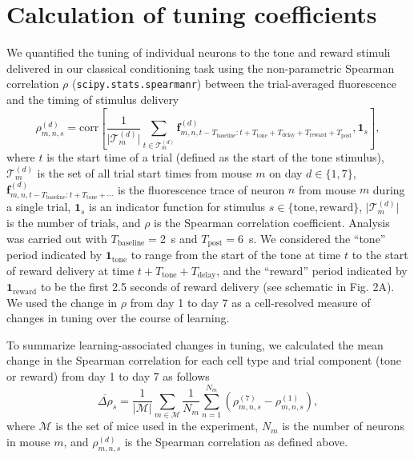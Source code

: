 \documentclass{article}
\begin{document}
\section{Calculation of tuning coefficients}

We quantified the tuning of individual neurons to the tone and reward stimuli
delivered in our classical conditioning task using the non-parametric Spearman
correlation $\rho$ (\texttt{scipy.stats.spearmanr}) between the trial-averaged
fluorescence and the timing of stimulus delivery
\begin{equation}
    \rho_{m,n,s}^{(d)} =
    \text{corr} \left[%
        \frac{1}{\lvert \mathcal{T}_{m}^{(d)} \rvert}
        \sum_{t \in
        \mathcal{T}_{m}^{(d)}}
        \mathbf{f}_{m,n,t - T_\text{baseline}:t+T_\text{tone}
        + T_\text{delay} + T_\text{reward} + T_\text{post}}^{(d)},
        \mathbf{1}_s
    \right],
\end{equation}
where $t$ is the start time of a trial (defined as the start of the tone
stimulus), $\mathcal{T}_{m}^{(d)}$ is the set of all trial start times from
mouse $m$ on day $d \in \{1, 7\}$,
$\mathbf{f}_{m,n,t-T_\text{baseline}:t+T_\text{tone} + \cdots}^{(d)}$ is the
fluorescence trace of neuron $n$ from mouse $m$ during a single trial, $\mathbf{1}_s$ is an indicator function for stimulus $s \in \{\text{tone},
\text{reward}\}$, $\lvert \mathcal{T}_{m}^{(d)} \rvert$ is the number of trials,
and $\rho$ is the Spearman correlation coefficient.  Analysis was carried out
with $T_\text{baseline} =$\SI{2}{\s} and $T_\text{post} =$\SI{6}{\s}.  We
considered the ``tone'' period indicated by $\mathbf{1}_\text{tone}$ to range
from the start of the tone at time $t$ to the start of reward delivery at time
$t + T_\text{tone} + T_\text{delay}$, and the ``reward'' period indicated by
$\mathbf{1}_\text{reward}$ to be the first 2.5 seconds of reward delivery (see
schematic in Fig. 2A). We used the change in $\rho$ from day 1 to day 7 as a
cell-resolved measure of changes in tuning over the course of learning.

To summarize learning-associated changes in tuning, we calculated the mean
change in the Spearman correlation for each cell type and trial component (tone
or reward) from day 1 to day 7 as follows
\begin{equation}
    \overline{\Delta\rho}_{s} = \frac{1}{\lvert \mathcal{M} \rvert} \sum_{m \in \mathcal{M}} \frac{1}{N_m} \sum_{n=1}^{N_m}
    \left(\rho_{m,n,s}^{(7)} - \rho_{m,n,s}^{(1)}\right),
\end{equation}
where $\mathcal{M}$ is the set of mice used in the experiment, $N_m$ is the
number of neurons in mouse $m$, and $\rho_{m,n,s}^{(d)}$ is the Spearman
correlation as defined above.
\end{document}
